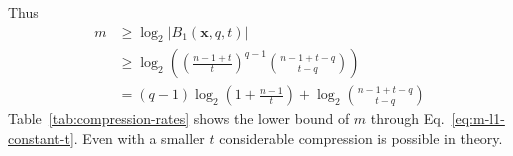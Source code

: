\documentclass[pdflatex,sn-mathphys-num]{sn-jnl}
\theoremstyle{definition}
\newcommand{\vtr}[1]{\mathbf{#1}}
\newcommand{\drawrandom}{\overset{{\scriptscriptstyle\$}}{\leftarrow}}
\newcommand*{\has}[1]{{\textcolor{red}{[#1 ---hassan]}}}
\begin{document}
Thus
\begin{align}
    m &\geq \log_2 |B_1(\vtr{x}, q, t)| \nonumber \\
    & \geq \log_2 \left( \left( \frac{n-1 + t}{t} \right)^{q-1}  \binom{n -1 + t - q}{t-q} \right) \nonumber \\
    &= (q - 1) \log_2 \left(1 + \frac{n-1}{t} \right) + \log_2 \binom{n -1 + t - q}{t-q}  \label{eq:m-l1-constant-t}
\end{align}
Table~\ref{tab:compression-rates} shows the lower bound of $m$ through Eq.~\ref{eq:m-l1-constant-t}. Even with a smaller $t$ considerable compression is possible in theory. 


\end{document}

